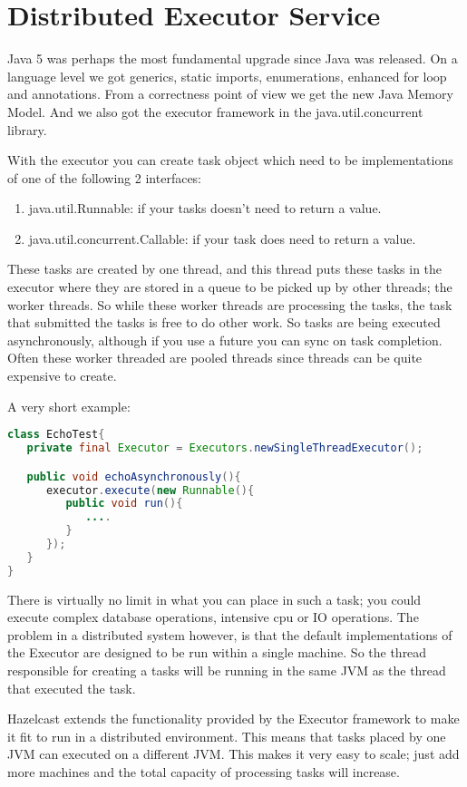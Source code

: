 \chapter{Distributed Executor Service}

Java 5 was perhaps the most fundamental upgrade since Java was released. On a language level we got generics, static imports, enumerations, enhanced for loop and annotations. From a correctness point of view we get the new Java Memory Model. And we also got the executor framework in the java.util.concurrent library.

With the executor you can create task object which need to be implementations of one of the following
2 interfaces:
\begin{enumerate}
\item java.util.Runnable: if your tasks doesn't need to return a value.
\item java.util.concurrent.Callable: if your task does need to return a value.
\end{enumerate}
These tasks are created by one thread, and this thread puts these tasks in the executor where they are stored in a queue to be picked up by other threads; the worker threads. So while these worker threads are processing the tasks, the task that submitted the tasks is free to do other work. So tasks are being executed asynchronously, although if you use a future you can sync on task completion. Often these worker threaded are pooled threads since threads can be quite expensive to create. 

A very short example:
\begin{lstlisting}[language=java]
class EchoTest{
   private final Executor = Executors.newSingleThreadExecutor();

   public void echoAsynchronously(){
      executor.execute(new Runnable(){
         public void run(){
            ....
         }
      });	
   }
}
\end{lstlisting}

There is virtually no limit in what you can place in such a task; you could execute complex database operations, intensive cpu or IO operations. The problem in a distributed system however, is that the default implementations of the Executor are designed to be run within a single machine. So the thread responsible for creating a tasks will be running in the same JVM as the thread that executed the task.

Hazelcast extends the functionality provided by the Executor framework to make it fit to run in a distributed environment. This means that tasks placed by one JVM can executed on a different JVM. This makes it very easy to scale; just add more machines and the total capacity of processing tasks will increase.

